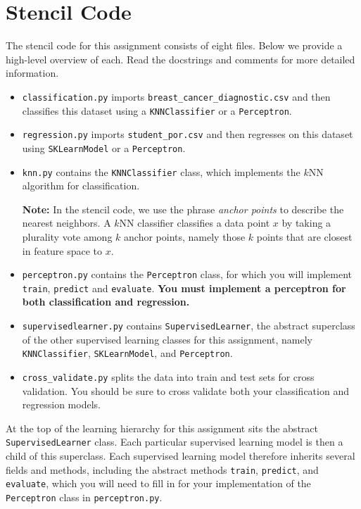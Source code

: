 \documentclass{article}
\begin{document}
\section{Stencil Code}
The stencil code for this assignment consists of eight files.
Below we provide a high-level overview of each.
Read the docstrings and comments for more detailed information.

\begin{itemize}
\item \verb|classification.py| imports \verb|breast_cancer_diagnostic.csv|
  and then classifies this dataset using a \verb|KNNClassifier| or a \verb|Perceptron|.

\item \verb|regression.py| imports \verb|student_por.csv| and then regresses
  on this dataset using \verb|SKLearnModel| or a \verb|Perceptron|.

\item \verb|knn.py| contains the \verb|KNNClassifier| class,
  which implements the $k$NN algorithm for classification.

  \textbf{Note:} In the stencil code, we use the phrase \emph{anchor points} to describe the nearest neighbors.
A $k$NN classifier classifies a data point $x$ by taking a plurality vote among $k$ anchor points,
namely those $k$ points that are closest in feature space to $x$.

\item \verb|perceptron.py| contains the \verb|Perceptron| class,
  for which you will implement \verb|train|, \verb|predict| and \verb|evaluate|.
  \textbf{You must implement a perceptron for both classification and regression.}

\item \verb|supervisedlearner.py| contains \verb|SupervisedLearner|,
  the abstract superclass of the other supervised learning classes for
  this assignment, namely \verb|KNNClassifier|, \verb|SKLearnModel|, and \verb|Perceptron|.

\item \verb|cross_validate.py| splits the data into train and test sets for cross validation.
  You should be sure to cross validate both your classification and regression models.
\end{itemize}

At the top of the learning hierarchy for this assignment sits the abstract \verb|SupervisedLearner| class.
Each particular supervised learning model is then a child of this superclass.
Each supervised learning model therefore inherits several fields and methods,
including the abstract methods \verb|train|, \verb|predict|, and \verb|evaluate|,
which you will need to fill in for your implementation of the \verb|Perceptron| class in \verb|perceptron.py|.
\fi
\end{document}
